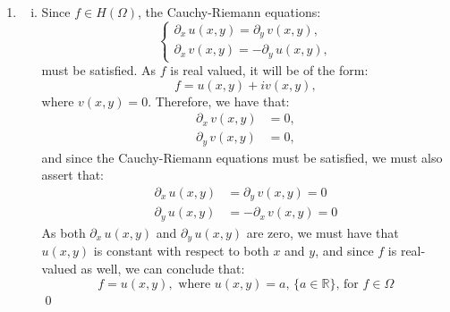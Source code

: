 \documentclass[a4paper, titlepage, DIV=14]{scrartcl}
\begin{document}
\begin{enumerate}
\begin{enumerate}[i)]
        \end{enumerate} 
        
        \item 
        \begin{enumerate}[i)]
            \item Since $f \in H(\Omega)$, the Cauchy-Riemann equations:
            \[
            \begin{cases}
                \partial_{x} \, u(x,y) = \partial_{y} \, v(x,y), \\
                \partial_{x} \, v(x,y) = -\partial_{y} \, u(x,y),
            \end{cases} 
            \] must be satisfied. As $f$ is real valued, it will be of the form:
            \begin{equation*}
                f = u(x,y) + iv(x,y),
            \end{equation*} where $v(x,y)=0$. Therefore, we have that:
            \begin{align*}
                \partial_{x} \, v(x,y) &= 0, \\
                \partial_{y} \, v(x,y) &= 0,
            \end{align*} and since the Cauchy-Riemann equations must be satisfied, we 
            must also assert that:
            \begin{align*}
                \partial_{x} \, u(x,y) &= \partial_{y} \, v(x,y) = 0 \\
                \partial_{y} \, u(x,y) &= - \partial_{x} \, v(x,y) = 0
            \end{align*}
            As both $\partial_{x} \, u(x,y)$ and $\partial_{y} \, u(x,y)$ are zero, we must
            have that $u(x,y)$ is constant with respect to both $x$ and $y$, and since $f$ is 
            real-valued as well, we can conclude that:
            \begin{equation*}
                f = u(x,y), \text{ where } u(x,y) = a, \, \{a \in \mathbb{R}\}, \, \text{for } f \in \Omega
            \end{equation*} \qed \\


\end{enumerate}
\end{enumerate}
\end{document}
